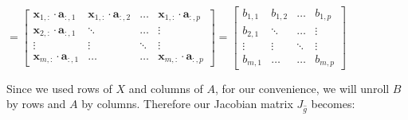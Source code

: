 \documentclass{article}
\begin{document}
\begin{center}$
= \begin{bmatrix}
    \mathbf{x}_{1,:} \cdot \mathbf{a}_{:,1} & \mathbf{x}_{1,:} \cdot \mathbf{a}_{:,2} &\hdots & \mathbf{x}_{1,:} \cdot \mathbf{a}_{:,p} \\
    \mathbf{x}_{2,:} \cdot \mathbf{a}_{:,1}  & \ddots &\hdots & \vdots \\
    \vdots & \vdots & \ddots & \vdots\\
    \mathbf{x}_{m,:} \cdot \mathbf{a}_{:,1}  & \hdots & \hdots & \mathbf{x}_{m,:} \cdot \mathbf{a}_{:,p}
\end{bmatrix}
= \begin{bmatrix}
    b_{1, 1} & b_{1,2} &\hdots & b_{1,p} \\
    b_{2,1}  & \ddots &\hdots & \vdots \\
    \vdots & \vdots & \ddots & \vdots\\
    b_{m,1}  & \hdots & \hdots & b_{m,p}
\end{bmatrix}
$
\end{center}
Since we used rows of $X$ and columns of $A$, for our convenience, we will unroll $B$ by rows and $A$ by columns. Therefore our Jacobian matrix $J_{\widehat{g}}$ becomes:
\end{document}
